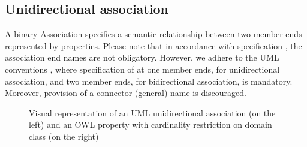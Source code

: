 
\renewcommand{\thefootnote}{\arabic{footnote}}

\subsection{Unidirectional association}
\label{sec:association-uni}

A binary Association specifies a semantic relationship between two
member ends represented by properties. Please note that in accordance with
specification \citep{uml2.5}, the association end names are not obligatory. However, we adhere to the UML conventions \citep{costetchi2020b}, where specification of at one member ends, for unidirectional association, and two member ends, for bidirectional association, is mandatory. Moreover, provision of a connector (general) name is discouraged.

\begin{figure}[!ht]
	\centering
	\begin{subfigure}{.385\textwidth}
		\centering
	\end{subfigure}%
	\begin{subfigure}{.6\textwidth}
		\centering
	\end{subfigure}
	\caption{Visual representation of an UML unidirectional association (on the left) and an OWL property with cardinality restriction on domain class (on the right)}
	\label{fig:association-uni-visual}
\end{figure}

